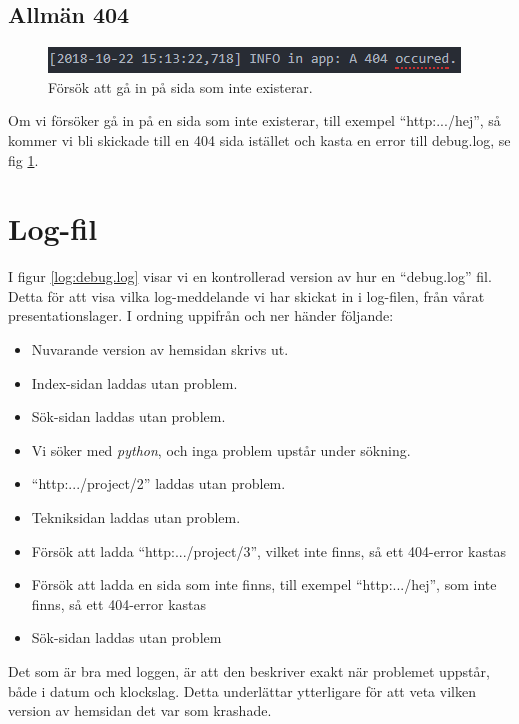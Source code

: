 \documentclass{TDP003mall}
\begin{document}
\subsection{Allmän 404}
\begin{figure}[H]
    \centering
    \includegraphics[width=\linewidth]{404.png}
    \caption{Försök att gå in på sida som inte existerar.}
    \label{fig:404}
\end{figure}
Om vi försöker gå in på en sida som inte existerar, till exempel \enquote{http:.../hej}, så kommer vi bli skickade till en 404 sida istället och kasta en error till debug.log, se fig \ref{fig:404}.
\newpage
\section{Log-fil}

I figur \ref{log:debug.log} visar vi en kontrollerad version av hur en \enquote{debug.log} fil. Detta för att visa  vilka log-meddelande vi har skickat in i log-filen, från vårat presentationslager. I ordning uppifrån och ner händer följande:
\begin{itemize}
     \item Nuvarande version av hemsidan skrivs ut.
     \item Index-sidan laddas utan problem.
     \item Sök-sidan laddas utan problem.
     \item Vi söker med \textit{python}, och inga problem upstår under sökning.
     \item \enquote{http:.../project/2} laddas utan problem.
     \item Tekniksidan laddas utan problem.
     \item Försök att ladda \enquote{http:.../project/3}, vilket inte finns, så ett 404-error kastas
     \item Försök att ladda en sida som inte finns, till exempel \enquote{http:.../hej}, som inte finns, så ett 404-error kastas
     \item Sök-sidan laddas utan problem
\end{itemize}
Det som är bra med loggen, är att den beskriver exakt när problemet uppstår, både i datum och klockslag. Detta underlättar ytterligare för att veta vilken version av hemsidan det var som krashade.
\newpage
\end{document}
